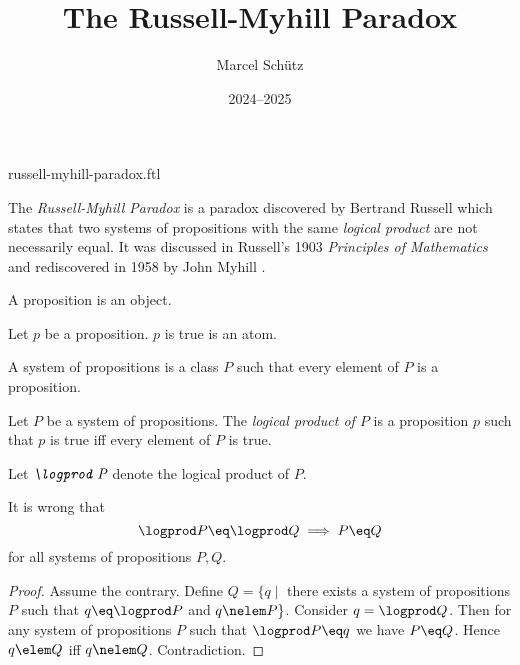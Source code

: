\documentclass{article}
\title{The Russell-Myhill Paradox}
\author{Marcel Schütz}
\date{2024--2025}
\begin{document}
\begin{smodule}{russell-myhill-paradox.ftl}
\maketitle



\noindent The \emph{Russell-Myhill Paradox} is a paradox discovered by 
Bertrand Russell which states that two systems of propositions with the same 
\emph{logical product} are not necessarily equal.
It was discussed in Russell's 1903 \emph{Principles of Mathematics}
\cite[Appendix B]{Russell1903} and rediscovered in 1958 by John Myhill
\cite{Myhill1958}.

\begin{forthel}
  \begin{signature*}
    A proposition is an object.
  \end{signature*}

  \begin{signature*}
    Let $p$ be a proposition.
    $p$ is true is an atom.
  \end{signature*}

  \begin{definition*}
    A system of propositions is a class $P$ such that every element of $P$ is a proposition.
  \end{definition*}

  \begin{signature*}
    Let $P$ be a system of propositions.
    The \emph{logical product of $P$} is a proposition $p$ such that $p$ is true iff every element of $P$ is true.
  \end{signature*}
  
  Let $\emph{\logprod P}$ denote the logical product of $P$.
  
  \begin{theorem*}[title=Russell-Myhill Paradox,id=russell_myhill_paradox]
    It is wrong that
    \[ \logprod P \eq \logprod Q \implies P \eq Q \]
    for all systems of propositions $P, Q$.
  \end{theorem*}
  \begin{proof}
    Assume the contrary.
    Define $Q = \{q \mid$ there exists a system of propositions $P$ such that $q \eq \logprod P$ and $q \nelem P\}$.
    Consider $q = \logprod Q$.
    Then for any system of propositions $P$ such that $\logprod P \eq q$ we have $P \eq Q$.
    Hence $q \elem Q$ iff $q \nelem Q$.
    Contradiction.
  \end{proof}
\end{forthel}

\printbibliography
{}
\end{smodule}
\end{document}
